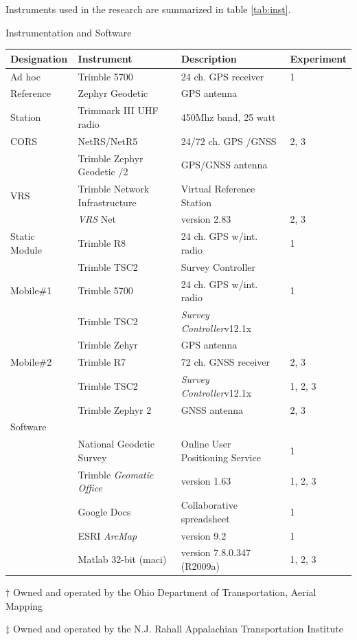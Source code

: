 Instruments used in the research are summarized in table \ref{tab:inst}.
\begin{center}
\begin{threeparttable}
	\caption{Instrumentation and Software}\label{tab:inst}
	\begin{tabular}{llll}%
\toprule
	Designation & Instrument & Description &  Experiment\\
\midrule
	Ad hoc& Trimble 5700 & 24 ch. GPS receiver & 1\\
	Reference& Zephyr Geodetic & GPS antenna & \\
	Station& Trimmark III UHF radio & 450Mhz band, 25 watt& \\
\midrule
	CORS & NetRS/NetR5 & 24/72 ch. GPS\tnote{$\dagger$} /\-GNSS\tnote{$\ddagger$} & 2, 3\\
	& Trimble Zephyr Geodetic /2 & GPS/\-GNSS antenna &\\
	VRS & Trimble Network Infrastructure & Virtual Reference Station &\\
	& \emph{VRS} Net & version 2.83\tnote{$\dagger$} & 2, 3 \\
\midrule
	Static Module & Trimble R8 & 24 ch. GPS w/int. radio &1\\
	& Trimble TSC2 & Survey Controller &\\
\midrule
	Mobile\#1           & Trimble 5700 & 24 ch. GPS w/int. radio & 1\\
	& Trimble TSC2 & \emph{Survey Controller}v12.1x &\\
	& Trimble Zehyr & GPS antenna &\\
\midrule
	Mobile\#2                & Trimble R7 & 72 ch. GNSS receiver& 2, 3\\
	& Trimble TSC2       & \emph{Survey Controller}v12.1x &1, 2, 3\\
	& Trimble Zephyr 2 & GNSS antenna & 2, 3\\
\midrule
\multicolumn{3}{l}{Software}\\
	& National Geodetic Survey & Online User Positioning Service & 1 \\
	& Trimble \emph{Geomatic Office} & version 1.63 & 1, 2, 3 \\
	& Google Docs & Collaborative spreadsheet & 1\\
	& ESRI \emph{ArcMap}    & version 9.2     & 1 \\
	& Matlab 32-bit (maci)      &  version 7.8.0.347 (R2009a) & 1, 2, 3\\
	\bottomrule
	\end{tabular}
		\begin{tablenotes}
		\item[$\dagger$]{Owned and operated by the Ohio Department of Transportation, Aerial Mapping}
		\item[$\ddagger$]{Owned and operated by the N.J. Rahall Appalachian Transportation Institute}\\
		\end{tablenotes}
\end{threeparttable}
\end{center}

